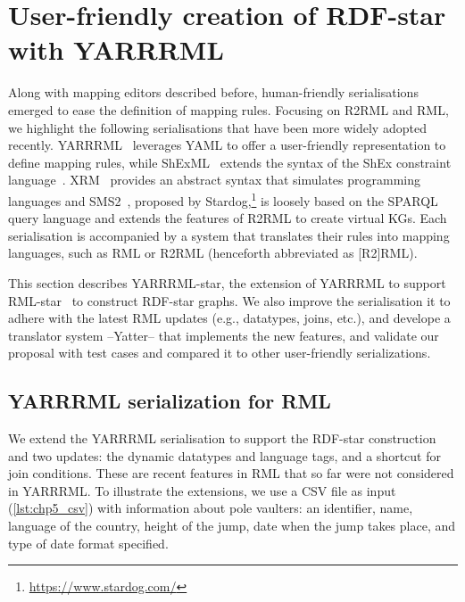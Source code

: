\section{User-friendly creation of RDF-star with YARRRML}
\label{sec:chp5_yarrrml_star}

Along with mapping editors described before, human-friendly serialisations emerged 
to ease the definition of mapping rules. Focusing on R2RML and RML, we highlight the following serialisations that have been more widely adopted recently.
YARRRML~\citep{Heyvaert2018yarrrml} leverages YAML
to offer a user-friendly representation to define mapping rules, while
ShExML~\citep{Garcia-Gonzalez2020shexml} extends the syntax of the ShEx constraint language~\citep{prud2014shex}.
XRM~\citep{xrm}
provides an abstract syntax that simulates programming languages and 
SMS2~\citep{sms2}, proposed by Stardog,\footnote{\label{foot:stardog}\url{https://www.stardog.com/}} is loosely based on the SPARQL query language and extends the features of R2RML to create virtual KGs.
Each serialisation is accompanied by a system that translates their rules into mapping languages, such as RML or R2RML (henceforth abbreviated as [R2]RML). 

This section describes YARRRML-star, the extension of YARRRML to support RML-star~\citep{delva2021rml-star} to construct RDF-star graphs.
We also improve the serialisation it to adhere with the latest RML updates
(e.g., datatypes, joins, etc.), and develope a translator system --Yatter-- that implements the new features, and validate our proposal with test cases and compared it to other user-friendly serializations.

\subsection{YARRRML serialization for RML}
\label{sec:chp5_yarrrml-desc}
We extend the YARRRML serialisation to support the RDF-star construction and two updates: the dynamic datatypes and language tags, and a shortcut for join conditions. These are recent features in RML that so far were not considered in YARRRML.
To illustrate the extensions,
we use a CSV file as input (\cref{lst:chp5_csv}) with information about pole vaulters: an identifier, name, language of the country, height of the jump, date when the jump takes place, and type of date format specified.

